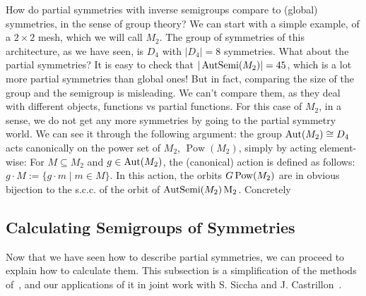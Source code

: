 How do partial symmetries with inverse semigroups compare to (global) symmetries, in the sense of group theory?
We can start with a simple example, of a $2\times 2$ mesh, which we will call $M_2$. The group of symmetries of this architecture, as we have seen, is $D_4$ with $|D_4| = 8$ symmetries.
What about the partial symmetries? It is easy to check that $|\operatorname{AutSemi}(M_2)| = 45$, which is a lot more partial symmetries than global ones! But in fact, comparing the size of the group and the semigroup is misleading.
We can't compare them, as they deal with different objects, functions vs partial functions. For this case of $M_2$, in a sense, we do not get any more symmetries by going to the partial symmetry world.
We can see it through the following argument: the group $\operatorname{Aut}(M_2) \cong D_4$ acts canonically on the power set of $M_2$, $\operatorname{Pow}(M_2)$, simply by acting element-wise:
For $M \subseteq M_2$ and $g \in \operatorname{Aut}(M_2)$, the (canonical) action is defined as follows: $g \cdot M := \{ g \cdot m \mid m \in M \}$.
In this action, the orbits $G \\ \operatorname{Pow}(M_2)$ are in obvious bijection to the s.c.c. of the orbit of $\operatorname{AutSemi}(M_2) \\ \operatorname{M_2}$.
Concretely




\subsection{Calculating Semigroups of Symmetries}

Now that we have seen how to describe partial symmetries, we can proceed to explain how to calculate them.
This subsection is a simplification of the methods of~\cite{east2019semigroups}, and our applications of it in joint work with S. Siccha and J. Castrillon~\cite{goens_taco17}.
